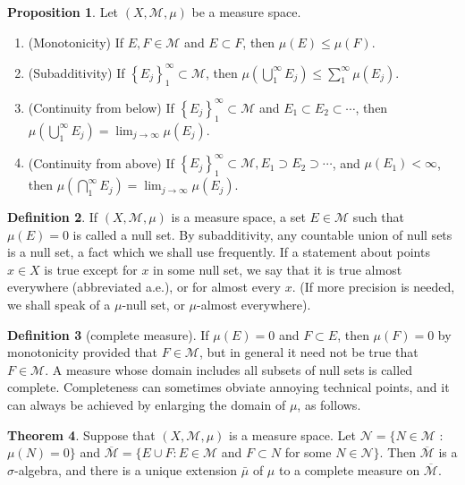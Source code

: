 \documentclass[12pt,a4paper]{book}
\newenvironment{enu}{\begin{enumerate}[(1)]}{\end{enumerate}}
\theoremstyle{definition}
\newtheorem{defn}{Definition}[section]
\newtheorem{theo}[defn]{Theorem}
\newtheorem{prop}[defn]{Proposition}
\begin{document}
\begin{prop}
    Let $(X, \mathcal{M}, \mu)$ be a measure space.
    \begin{enu}
        \item (Monotonicity) If $E, F \in \mathcal{M}$ and $E \subset F$, then $\mu(E) \leq \mu(F)$.
        \item (Subadditivity) If $\left\{E_j\right\}_1^{\infty} \subset \mathcal{M}$, then $\mu\left(\bigcup_1^{\infty} E_j\right) \leq \sum_1^{\infty} \mu\left(E_j\right)$.
        \item (Continuity from below) If $\left\{E_j\right\}_1^{\infty} \subset \mathcal{M}$ and $E_1 \subset E_2 \subset \cdots$, then $\mu\left(\bigcup_1^{\infty} E_j\right)=\lim _{j \rightarrow \infty} \mu\left(E_j\right)$.
        \item (Continuity from above) If $\left\{E_j\right\}_1^{\infty} \subset \mathcal{M}, E_1 \supset E_2 \supset \cdots$, and $\mu\left(E_1\right)<\infty$, then $\mu\left(\bigcap_1^{\infty} E_j\right)=\lim _{j \rightarrow \infty} \mu\left(E_j\right)$.
    \end{enu}
\end{prop}
\begin{defn}
    If $(X, \mathcal{M}, \mu)$ is a measure space,
    a set $E \in \mathcal{M}$ such that $\mu(E)=0$ is called a null set. By subadditivity,
    any countable union of null sets is a null set, a fact which we shall use frequently.
    If a statement about points $x \in X$ is true except for $x$ in some null set, we say that it is true almost
    everywhere (abbreviated a.e.), or for almost every $x$. (If more precision is needed,
    we shall speak of a $\mu$-null set, or $\mu$-almost everywhere).
\end{defn}
\begin{defn}[complete measure]
    If $\mu(E)=0$ and $F \subset E$, then $\mu(F)=0$ by monotonicity provided that $F \in \mathcal{M}$, but in general it need not be true that $F \in \mathcal{M}$. A measure whose domain includes all subsets of null sets is called complete. 
    Completeness can sometimes obviate annoying technical points, and it can always be achieved by enlarging the domain of $\mu$, as follows.
\end{defn}
\begin{theo}
    Suppose that $(X, \mathcal{M}, \mu)$ is a measure space. Let $\mathcal{N}=\{N \in \mathcal{M}$ : $\mu(N)=0\}$ and $\overline{\mathcal{M}}=\{E \cup F: E \in \mathcal{M}$ and $F \subset N$ for some $N \in \mathcal{N}\}$. Then $\overline{\mathcal{M}}$ is a $\sigma$-algebra, and there is a unique extension $\bar{\mu}$ of $\mu$ to a complete measure on $\overline{\mathcal{M}}$.
\end{theo}
\end{document}
